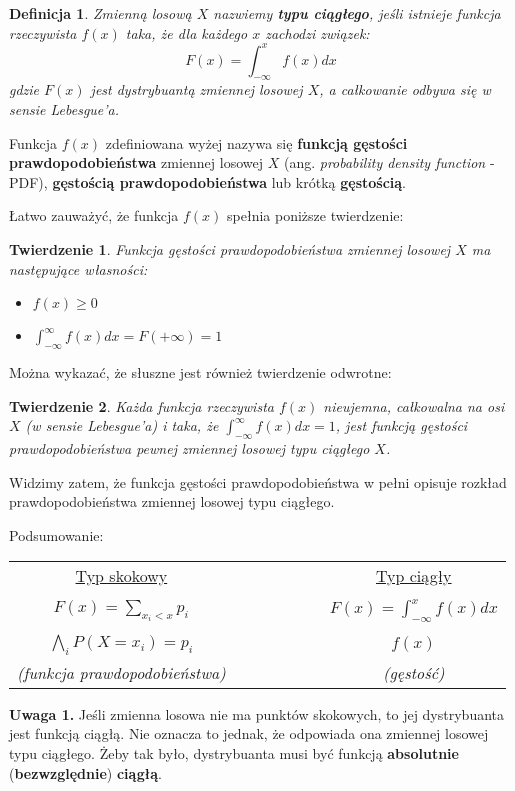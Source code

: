\documentclass[10pt,a4paper]{article}
\newtheorem{defin}{Definicja}[section]
\newtheorem{twier}{Twierdzenie}[section]
\begin{document}
\begin{defin}
Zmienną losową $X$ nazwiemy \textbf{typu ciągłego}, jeśli istnieje funkcja rzeczywista $f(x)$ taka, że dla każdego $x$ zachodzi związek:
\begin{equation}
F(x)=\int_{-\infty}^{x}f(x)dx
\end{equation}
gdzie $F(x)$ jest dystrybuantą zmiennej losowej $X$, a całkowanie odbywa się w sensie Lebesgue'a. 
\end{defin}
Funkcja $f(x)$ zdefiniowana wyżej nazywa się \textbf{funkcją gęstości
prawdopodobieństwa} zmiennej losowej $X$ (ang. \textit{probability density function} - PDF), \textbf{gęstością prawdopodobieństwa} lub krótką \textbf{gęstością}.

Łatwo zauważyć, że funkcja $f(x)$ spełnia poniższe twierdzenie:
\begin{twier}
Funkcja gęstości prawdopodobieństwa zmiennej losowej $X$ ma następujące własności:
\begin{itemize}
\item $f(x) \geq 0$
\item $\int_{-\infty}^\infty f(x)dx = F(+\infty) = 1$
\end{itemize}
\end{twier}
Można wykazać, że słuszne jest również twierdzenie odwrotne:
\begin{twier}
Każda funkcja rzeczywista $f(x)$ nieujemna, całkowalna na osi $X$ (w sensie Lebesgue'a) i taka, że $\int_{-\infty}^\infty f(x)dx = 1$, jest funkcją gęstości prawdopodobieństwa
pewnej zmiennej losowej typu ciągłego $X$. 
\end{twier}
Widzimy zatem, że funkcja gęstości prawdopodobieństwa w pełni opisuje rozkład prawdopodobieństwa zmiennej losowej typu
ciągłego.

Podsumowanie:
\begin{center}
\begin{tabular}{ccc}
\underline{Typ skokowy} & ~~~~~~~~~ & \underline{Typ ciągły} \\ \\ 
$F(x)=\sum_{x_i<x}p_i$ &  & $F(x)=\int_{-\infty}^{x}f(x)dx$ \\ \\ 
$\bigwedge_i P(X=x_i)=p_i$ & & $f(x)$ \\ 
\textit{(funkcja prawdopodobieństwa)} & & \textit{(gęstość)}
\end{tabular}
\end{center}

\textbf{Uwaga 1.} Jeśli zmienna losowa nie ma punktów skokowych, to jej dystrybuanta jest funkcją ciągłą. Nie oznacza to jednak, że odpowiada ona zmiennej losowej
typu ciągłego. Żeby tak było, dystrybuanta musi być funkcją \textbf{absolutnie} (\textbf{bezwzględnie}) \textbf{ciągłą}.
\end{document}
